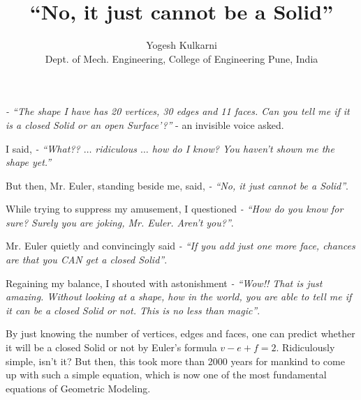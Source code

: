 \documentclass[12pt]{article}
\title{``No, it just cannot be a Solid''} %
\author{Yogesh Kulkarni\\Dept. of Mech. Engineering, College of Engineering Pune, India} %
\date{} %
\begin{document}
\maketitle
\vspace{-10mm}

{\em - ``The shape I have has 20 vertices, 30 edges and 11 faces. Can you tell me if it is a closed Solid or an open Surface'?''} - an invisible voice asked.


I said, {\em - ``What?? $\ldots$ ridiculous $\ldots$ how do I know? You haven't shown me the shape yet.''}


But then, Mr. Euler, standing beside me, said, {\em - ``No, it just cannot be a Solid''}.


While trying to suppress my amusement, I questioned {\em - ``How do you know for sure? Surely you are joking, Mr. Euler. Aren't you?''}.


Mr. Euler quietly and convincingly said {\em - ``If you add just one more face, chances are that you CAN get a closed Solid''}.


Regaining my balance, I shouted with astonishment {\em - ``Wow!! That is just amazing. Without looking at a shape, how in the world, you are able to tell me if it can be a closed Solid or not. This is no less than magic''}.


By just knowing the number of vertices, edges and faces, one can predict whether it will be a closed Solid or not by Euler's formula $v - e + f = 2$. Ridiculously simple, isn't it? But then, this took more than 2000 years for mankind  to come  up with such a simple equation, which is now one of the most fundamental equations of Geometric Modeling.
\end{document}
